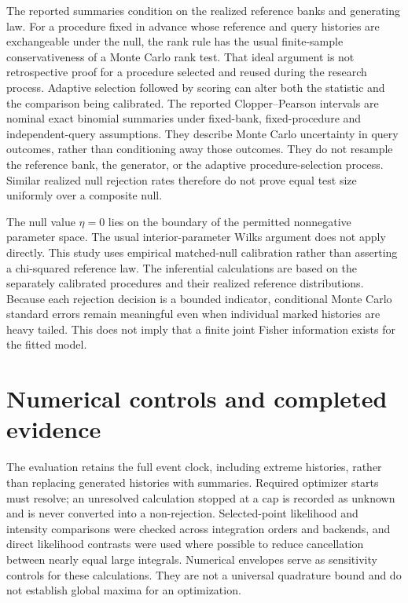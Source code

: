 The reported summaries condition on the realized reference banks and generating law. For a procedure fixed in advance whose reference and query histories are exchangeable under the null, the rank rule has the usual finite-sample conservativeness of a Monte Carlo rank test. That ideal argument is not retrospective proof for a procedure selected and reused during the research process. Adaptive selection followed by scoring can alter both the statistic and the comparison being calibrated. The reported Clopper--Pearson intervals are nominal exact binomial summaries under fixed-bank, fixed-procedure and independent-query assumptions. They describe Monte Carlo uncertainty in query outcomes, rather than conditioning away those outcomes. They do not resample the reference bank, the generator, or the adaptive procedure-selection process. Similar realized null rejection rates therefore do not prove equal test size uniformly over a composite null.

The null value \(\eta=0\) lies on the boundary of the permitted nonnegative parameter space. The usual interior-parameter Wilks argument does not apply directly. This study uses empirical matched-null calibration rather than asserting a chi-squared reference law. The inferential calculations are based on the separately calibrated procedures and their realized reference distributions. Because each rejection decision is a bounded indicator, conditional Monte Carlo standard errors remain meaningful even when individual marked histories are heavy tailed. This does not imply that a finite joint Fisher information exists for the fitted model.

\section{Numerical controls and completed evidence}

The evaluation retains the full event clock, including extreme histories, rather than replacing generated histories with summaries. Required optimizer starts must resolve; an unresolved calculation stopped at a cap is recorded as unknown and is never converted into a non-rejection. Selected-point likelihood and intensity comparisons were checked across integration orders and backends, and direct likelihood contrasts were used where possible to reduce cancellation between nearly equal large integrals. Numerical envelopes serve as sensitivity controls for these calculations. They are not a universal quadrature bound and do not establish global maxima for an optimization.

